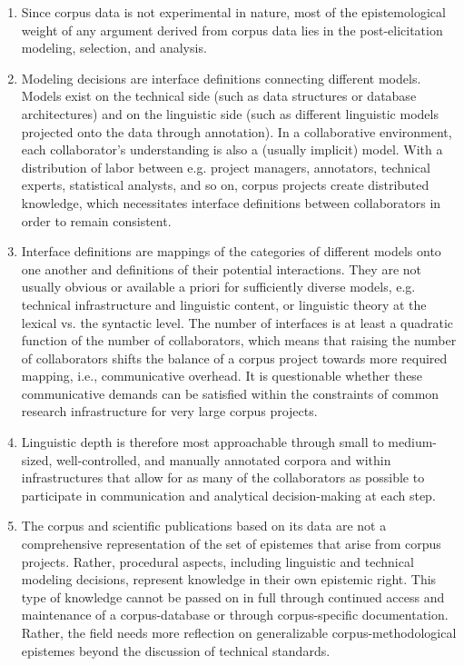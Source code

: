 \documentclass[output=paper,colorlinks,citecolor=brown]{langscibook}
\begin{document}
\begin{enumerate}
    \item Since corpus data is not experimental in nature, most of the epistemological weight of any argument derived from corpus data lies in the post-elicitation modeling, selection, and analysis.
    \item Modeling decisions are interface definitions connecting different models. Models exist on the technical side (such as data structures or database architectures) and on the linguistic side (such as different linguistic models projected onto the data through annotation). In a collaborative environment, each collaborator's understanding is also a (usually implicit) model. With a distribution of labor between e.g. project managers, annotators, technical experts, statistical analysts, and so on, corpus projects create distributed knowledge, which necessitates interface definitions between collaborators in order to remain consistent. 
    \item Interface definitions are mappings of the categories of different models onto one another and definitions of their potential interactions. They are not usually obvious or available a priori for sufficiently diverse models, e.g. technical infrastructure and linguistic content, or linguistic theory at the lexical vs. the syntactic level. The number of interfaces is at least a quadratic function of the number of collaborators, which means that raising the number of collaborators shifts the balance of a corpus project towards more required mapping, i.e., communicative overhead. It is questionable whether these communicative demands can be satisfied within the constraints of common research infrastructure for very large corpus projects. 
    \item Linguistic depth is therefore most approachable through small to medium-sized, well-controlled, and manually annotated corpora and within infrastructures that allow for as many of the collaborators as possible to participate in communication and analytical decision-making at each step. 
    \item\sloppy The corpus and scientific publications based on its data are  not a comprehensive representation of the set of epistemes that arise from corpus projects. Rather, procedural aspects, including linguistic and technical modeling decisions, represent knowledge in their own epistemic right. This type of knowledge cannot be passed on in full through continued access and maintenance of a corpus-database or through corpus-specific documentation. Rather, the field needs more reflection on generalizable corpus-methodological epistemes beyond the discussion of technical standards.
\end{enumerate}
\end{document}
